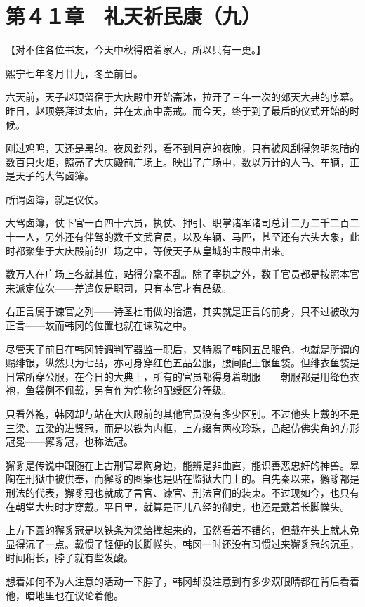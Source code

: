 \section{第４１章　礼天祈民康（九）}

【对不住各位书友，今天中秋得陪着家人，所以只有一更。】

熙宁七年冬月廿九，冬至前日。

六天前，天子赵顼留宿于大庆殿中开始斋沐，拉开了三年一次的郊天大典的序幕。昨日，赵顼祭拜过太庙，并在太庙中斋戒。而今天，终于到了最后的仪式开始的时候。

刚过鸡鸣，天还是黑的。夜风劲烈，看不到月亮的夜晚，只有被风刮得忽明忽暗的数百只火炬，照亮了大庆殿前广场上。映出了广场中，数以万计的人马、车辆，正是天子的大驾卤簿。

所谓卤簿，就是仪仗。

大驾卤簿，仗下官一百四十六员，执仗、押引、职掌诸军诸司总计二万二千二百二十一人，另外还有伴驾的数千文武官员，以及车辆、马匹，甚至还有六头大象，此时都聚集于大庆殿前的广场之中，等候天子从皇城的主殿中出来。

数万人在广场上各就其位，站得分毫不乱。除了宰执之外，数千官员都是按照本官来派定位次——差遣仅是职司，只有本官才有品级。

右正言属于谏官之列——诗圣杜甫做的拾遗，其实就是正言的前身，只不过被改为正言——故而韩冈的位置也就在谏院之中。

尽管天子前日在韩冈转调判军器监一职后，又特赐了韩冈五品服色，也就是所谓的赐绯银，纵然只为七品，亦可身穿红色五品公服，腰间配上银鱼袋。但绯衣鱼袋是日常所穿公服，在今日的大典上，所有的官员都得身着朝服——朝服都是用绛色衣袍，鱼袋例不佩戴，另有作为饰物的配绶区分等级。

只看外袍，韩冈却与站在大庆殿前的其他官员没有多少区别。不过他头上戴的不是三梁、五梁的进贤冠，而是以铁为内框，上方缀有两枚珍珠，凸起仿佛尖角的方形冠冕——獬豸冠，也称法冠。

獬豸是传说中跟随在上古刑官皋陶身边，能辨是非曲直，能识善恶忠奸的神兽。皋陶在刑狱中被供奉，而獬豸的图案也是贴在监狱大门上的。自先秦以来，獬豸都是刑法的代表，獬豸冠也就成了言官、谏官、刑法官们的装束。不过现如今，也只有在朝堂大典时才穿戴。平日里，就算是正儿八经的御史，也还是戴着长脚幞头。

上方下圆的獬豸冠是以铁条为梁给撑起来的，虽然看着不错的，但戴在头上就未免显得沉了一点。戴惯了轻便的长脚幞头，韩冈一时还没有习惯过来獬豸冠的沉重，时间稍长，脖子就有些发酸。

想着如何不为人注意的活动一下脖子，韩冈却没注意到有多少双眼睛都在背后看着他，暗地里也在议论着他。

